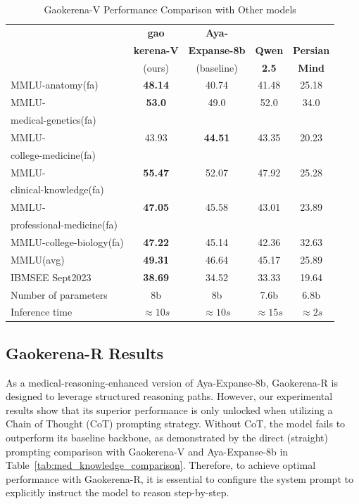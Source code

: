 \documentclass[review]{elsarticle}
\begin{document}
\begin{table}[ht]
		\centering
		\begin{tabular}{|l|c|c|c|c|}
			\hline
			\textbf{} & \textbf{gao} & \textbf{Aya-} &  &  \\
			& \textbf{kerena-V} & \textbf{Expanse-8b} & \textbf{Qwen} & \textbf{Persian} \\
			& (ours) & (baseline) & \textbf{2.5} & \textbf{Mind} \\ \hline
			MMLU-anatomy(fa)  & \textbf{48.14} & 40.74 & 41.48 & 25.18 \\ \hline
			MMLU- & \textbf{53.0} & 49.0 & 52.0 & 34.0 \\
            medical-genetics(fa)&  &  &  &  \\ \hline
			MMLU- & 43.93 & \textbf{44.51} & 43.35 & 20.23 \\
            college-medicine(fa)&  &  &  &  \\ \hline
			MMLU-& \textbf{55.47} & 52.07 & 47.92 & 25.28 \\
			clinical-knowledge(fa)&  &  &  &  \\ \hline
			MMLU-& \textbf{47.05} & 45.58 & 43.01 & 23.89 \\
			professional-medicine(fa)&  &  &  &  \\ \hline
			MMLU-college-biology(fa)& \textbf{47.22} & 45.14 & 42.36 & 32.63 \\ \hline
			MMLU(avg) & \textbf{49.31} & 46.64 & 45.17 & 25.89 \\ \hline
			IBMSEE Sept2023 & \textbf{38.69} & 34.52 & 33.33 & 19.64 \\  \hline
			Number of parameters & 8b & 8b & 7.6b & 6.8b \\ \hline
			Inference time & $\approx 10s$ & $\approx 10s$ & $\approx 15s$ & $\approx 2s$ \\  \hline
		\end{tabular}
        \caption{Gaokerena-V Performance Comparison with Other models}
		\label{tab:model_results_vs_general_purpose_languages}
\end{table}

\subsection{Gaokerena-R Results}

As a medical-reasoning-enhanced version of Aya-Expanse-8b, Gaokerena-R is designed to leverage structured reasoning paths. However, our experimental results show that its superior performance is only unlocked when utilizing a Chain of Thought (CoT) prompting strategy. Without CoT, the model fails to outperform its baseline backbone, as demonstrated by the direct (straight) prompting comparison with Gaokerena-V and Aya-Expanse-8b in Table~\ref{tab:med_knowledge_comparison}. Therefore, to achieve optimal performance with Gaokerena-R, it is essential to configure the system prompt to explicitly instruct the model to reason step-by-step.
\end{document}
